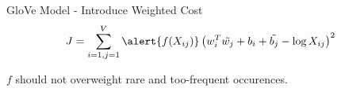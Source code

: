 \begin{frame}{GloVe Model - Introduce Weighted Cost}
  \begin{align*}
    & J = \sum_{i=1,j=1}^V \alert{f(X_{ij})} \left( w_i^T\tilde{w_j} +b_i + \tilde{b_j} - \log X_{ij} \right)^2
  \end{align*}
  \begin{center}
    $f$ should not overweight rare and too-frequent occurences.
  \end{center}
\end{frame}


